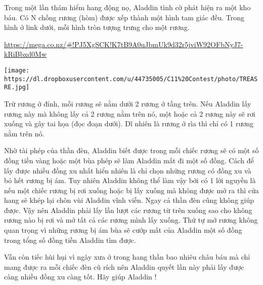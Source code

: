 Trong một lần thám hiểm hang động nọ, Aladdin tình cờ phát hiện ra một kho báu. Có N chồng rương (hòm) được xếp thành một hình tam giác đều. Trong hình ở link dưới, mỗi hình tròn tượng trưng cho một rương.

\href{https://mega.co.nz/#!PJ5XgSCK!K7tB9A0uJbmUk9d32r5jviW92OFbNyJ7-kRiBbxd0Mw}{https://mega.co.nz/\#!PJ5XgSCK!K7tB9A0uJbmUk9d32r5jviW92OFbNyJ7-kRiBbxd0Mw }


\texttt{[image: https://dl.dropboxusercontent.com/u/44735005/C11\%20Contest/photo/TREASRE.jpg]}

Trừ rương ở đỉnh, mỗi rương sẽ nằm dưới 2 rương ở tầng trên. Nếu Aladdin lấy rương này mà không lấy cả 2 rương nằm trên nó, một hoặc cả 2 rương này sẽ rơi xuống và gây tai họa (đọc đoạn dưới). Dĩ nhiên là rương ở rìa thì chỉ có 1 rương nằm trên nó.

Nhờ tài phép của thần đèn, Aladdin biết được trong mỗi chiếc rương sẽ có một số đồng tiền vàng hoặc một bùa phép sẽ làm Aladdin mất đi một số đồng. Cách để lấy được nhiều đồng xu nhất hiển nhiên là chỉ chọn những rương có đồng xu và bỏ hết rương bị ám. Tuy nhiên Aladdin không thể làm vậy bởi có 1 lời nguyền là nếu một chiếc rương bị rơi xuống hoặc bị lấy xuống mà không được mở ra thì cửa hang sẽ khép lại chôn vùi Aladdin vĩnh viễn. Ngay cả thần đèn cũng không giúp được. Vậy nên Aladdin phải lấy lần lượt các rương từ trên xuống sao cho không rương nào bị rơi và mở tất cả các rương mình lấy xuống. Thứ tự mở rương không quan trọng vì những rương bị ám bùa sẽ cướp mất của Aladdin một số đồng trong tổng số đồng tiền Aladdin tìm được.

Vẫn còn tiếc hùi hụi vì ngày xưa ở trong hang thần bao nhiêu châu báu mà chỉ mang được ra mỗi chiếc đèn cũ rích nên Aladdin quyết lần này phải lấy được càng nhiều đồng xu càng tốt. Hãy giúp Aladdin !
